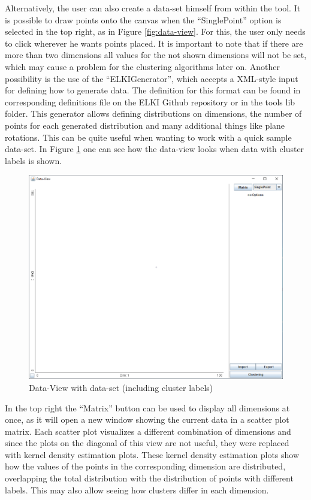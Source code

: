 \documentclass[
	a4paper,
	english,
	twoside,
	openright,               
	11pt                            
	]{report}
\begin{document}
Alternatively, the user can also create a data-set himself from within the tool. It is possible to draw points onto the canvas when the ``SinglePoint'' option is selected in the top right, as in Figure \ref{fig:data-view}. For this, the user only needs to click wherever he wants points placed. It is important to note that if there are more than two dimensions all values for the not shown dimensions will not be set, which may cause a problem for the clustering algorithms later on. Another possibility is the use of the ``ELKIGenerator'', which accepts a XML-style input for defining how to generate data. The definition for this format can be found in corresponding definitions file on the ELKI Github repository \cite{elkixml} or in the tools lib folder. This generator allows defining distributions on dimensions, the number of points for each generated distribution and many additional things like plane rotations. This can be quite useful when wanting to work with a quick sample data-set. In Figure \ref{fig:loaded-data} one can see how the data-view looks when data with cluster labels is shown. 

\begin{figure}[h]
	\centering
	\includegraphics[scale=.45]{data-view}
	\caption{Data-View with data-set (including cluster labels)}
	\label{fig:loaded-data}
\end{figure}

In the top right the ``Matrix'' button can be used to display all dimensions at once, as it will open a new window showing the current data in a scatter plot matrix. Each scatter plot visualizes a different combination of dimensions and since the plots on the diagonal of this view are not useful, they were replaced with kernel density estimation plots. These kernel density estimation plots show how the values of the points in the corresponding dimension are distributed, overlapping the total distribution with the distribution of points with different labels. This may also allow seeing how clusters differ in each dimension.
\end{document}
